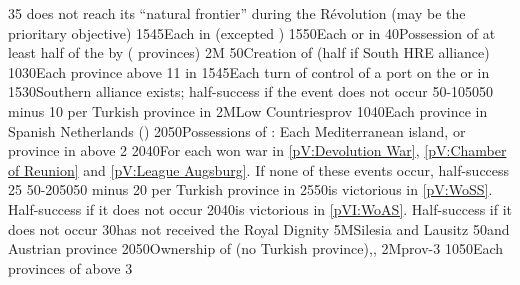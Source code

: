 {}{35}{ does not reach its ``natural frontier'' during the
  Révolution (may be the prioritary objective)}%
%
%
{15}{45}{Each \COL in  (excepted )}%
%
%
{15}{50}{Each \COL or \TP in }%
%
 
%
%
{}{40}{Possession of at least half of the \payshongrie by \AUSaus (
  provinces)}%
%
\EUobjective2M{}{}%
{}{50}{Creation of  (half if South HRE alliance)}%
%
%
{10}{30}{Each province above 11 in \paysmajeurAutriche}%
%
%
{15}{45}{Each turn of control of a port on the \seazoneBaltique or in
  \payshanse}%
%
%
{15}{30}{Southern \HRE alliance exists; half-success if the event does not
  occur}%
%
%
%
{50-10}{50}{50 \VPs minus 10 \VPs per Turkish province in \payshongrie}%
%
\EUobjective2M{Low Countries}{prov}%
{10}{40}{Each province in Spanish Netherlands (\regionBelgique)}%
%
%
{20}{50}{Possessions of : Each Mediterranean island, or province
  in  above 2}%
%
%
{20}{40}{For each won war in \ref{pV:Devolution War}, \ref{pV:Chamber of
    Reunion} and \ref{pV:League Augsburg}. If none of these events occur,
  half-success}%
%
%
{}{25}{}%
%
%
%
{50-20}{50}{50 \VPs minus 20 \VPs per Turkish province in \payshongrie}%
%
%
{25}{50}{\AUS is victorious in \ref{pV:WoSS}. Half-success if it does not
  occur}%
%
%
{20}{40}{\AUS is victorious in \ref{pVI:WoAS}. Half-success if it does not
  occur}%
%
%
{}{30}{\paysmajeurPrusse has not received the Royal Dignity}%
%
\EUobjective5M{Silesia and Lausitz}{}%
{}{50}{\provinceSilesie and \provinceLausitz Austrian province}%
%
%
%
{20}{50}{Ownership of \payshongrie (no Turkish
  province),\provinceBosna,\provinceSerbia}%
%
\EUobjective2M{\paysnaples}{prov-3}%
{10}{50}{Each provinces of \paysnaples above 3}%
